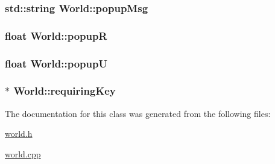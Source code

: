 \subsubsection[{popup\+Msg}]{\setlength{\rightskip}{0pt plus 5cm}std\+::string World\+::popup\+Msg\hspace{0.3cm}{\ttfamily [private]}}\label{classWorld_a9fafe9a7426c487a992615e518e90b23}
\hypertarget{classWorld_a9494741a4ec9fa6f5464d65e7bba936d}{}
\subsubsection[{popup\+R}]{\setlength{\rightskip}{0pt plus 5cm}float World\+::popup\+R\hspace{0.3cm}{\ttfamily [private]}}\label{classWorld_a9494741a4ec9fa6f5464d65e7bba936d}
\hypertarget{classWorld_a0ead2d71b58e78a8f321994436b3ed03}{}
\subsubsection[{popup\+U}]{\setlength{\rightskip}{0pt plus 5cm}float World\+::popup\+U\hspace{0.3cm}{\ttfamily [private]}}\label{classWorld_a0ead2d71b58e78a8f321994436b3ed03}
\hypertarget{classWorld_a412f2eb7706336e953b24031447a5060}{}
\subsubsection[{requiring\+Key}]{$\ast$ World\+::requiring\+Key\hspace{0.3cm}{\ttfamily [private]}}\label{classWorld_a412f2eb7706336e953b24031447a5060}


The documentation for this class was generated from the following files\+:\begin{DoxyCompactItemize}
\item 
\hyperlink{world_8h}{world.\+h}\item 
\hyperlink{world_8cpp}{world.\+cpp}\end{DoxyCompactItemize}
